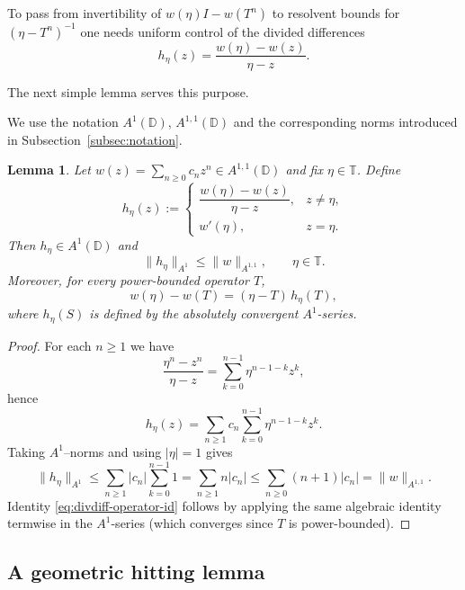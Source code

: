\documentclass[11pt]{amsart}
\numberwithin{equation}{section}
\newtheorem{lemma}[theorem]{Lemma}
\theoremstyle{definition}
\theoremstyle{plain}
\def\T{\mathbb{T}}
\def\D{\mathbb{D}}
\begin{document}
To pass from invertibility of $w(\eta)I-w(T^n)$ to
resolvent bounds for $(\eta -T^n)^{-1}$ one needs uniform control of the divided
differences
\[
  h_\eta(z)=\frac{w(\eta)-w(z)}{\eta-z}.
\]

The next simple lemma serves this purpose.

We use the notation $A^1(\D)$, $A^{1,1}(\D)$ and the corresponding norms introduced in Subsection~\ref{subsec:notation}.

\begin{lemma}\label{lem:divdiff-A11}
Let $w(z)=\sum_{n\ge0} c_n z^n\in A^{1,1}(\D)$ and fix $\eta\in\T$.
Define
\[
  h_\eta(z):=
  \begin{cases}
    \dfrac{w(\eta)-w(z)}{\eta-z}, & z\neq \eta,\\[1ex]
    w'(\eta), & z=\eta.
  \end{cases}
\]
Then $h_\eta\in A^1(\D)$ and
\begin{equation}\label{eq:h-eta-A1}
  \|h_\eta\|_{A^1}\le \|w\|_{A^{1,1}}, 
  \qquad \eta\in\T.
\end{equation}
Moreover, for every power-bounded operator $T$,
\begin{equation}\label{eq:divdiff-operator-id}
  w(\eta)-w(T)=(\eta-T)\,h_\eta(T),
\end{equation}
where $h_\eta(S)$ is defined by the absolutely convergent $A^1$-series.
\end{lemma}

\begin{proof}
For each $n\ge1$ we have
\[
  \frac{\eta^n-z^n}{\eta-z}=\sum_{k=0}^{n-1}\eta^{n-1-k}z^k,
\]
hence
\[
  h_\eta(z)=\sum_{n\ge1} c_n\sum_{k=0}^{n-1}\eta^{n-1-k}z^k.
\]
Taking $A^1$--norms and using $|\eta|=1$ gives
\[
  \|h_\eta\|_{A^1}
  \le \sum_{n\ge1}|c_n|\sum_{k=0}^{n-1}1
  =\sum_{n\ge1}n|c_n|
  \le \sum_{n\ge0}(n+1)|c_n|=\|w\|_{A^{1,1}}.
\]
Identity \eqref{eq:divdiff-operator-id} follows by applying the same algebraic identity
termwise in the $A^1$-series (which converges since $T$ is power-bounded).
\end{proof}

\subsection{A geometric hitting lemma}\label{subsec:arc-selection}
\end{document}
